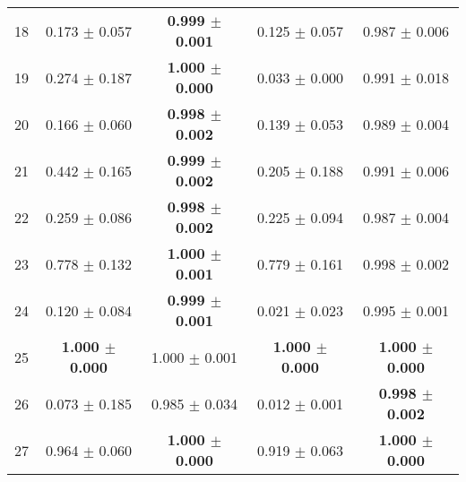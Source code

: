 \begin{table}[!ht]
{\begin{tabular}{r c c c c}
18 & 0.173 $\pm$ 0.057 & \textbf{0.999 $\pm$ 0.001} & 0.125 $\pm$ 0.057 & 0.987 $\pm$ 0.006 \\
19 & 0.274 $\pm$ 0.187 & \textbf{1.000 $\pm$ 0.000} & 0.033 $\pm$ 0.000 & 0.991 $\pm$ 0.018 \\
20 & 0.166 $\pm$ 0.060 & \textbf{0.998 $\pm$ 0.002} & 0.139 $\pm$ 0.053 & 0.989 $\pm$ 0.004 \\
21 & 0.442 $\pm$ 0.165 & \textbf{0.999 $\pm$ 0.002} & 0.205 $\pm$ 0.188 & 0.991 $\pm$ 0.006 \\
22 & 0.259 $\pm$ 0.086 & \textbf{0.998 $\pm$ 0.002} & 0.225 $\pm$ 0.094 & 0.987 $\pm$ 0.004 \\
23 & 0.778 $\pm$ 0.132 & \textbf{1.000 $\pm$ 0.001} & 0.779 $\pm$ 0.161 & 0.998 $\pm$ 0.002 \\
24 & 0.120 $\pm$ 0.084 & \textbf{0.999 $\pm$ 0.001} & 0.021 $\pm$ 0.023 & 0.995 $\pm$ 0.001 \\
25 & \textbf{1.000 $\pm$ 0.000} & 1.000 $\pm$ 0.001 & \textbf{1.000 $\pm$ 0.000} & \textbf{1.000 $\pm$ 0.000} \\
26 & 0.073 $\pm$ 0.185 & 0.985 $\pm$ 0.034 & 0.012 $\pm$ 0.001 & \textbf{0.998 $\pm$ 0.002} \\
27 & 0.964 $\pm$ 0.060 & \textbf{1.000 $\pm$ 0.000} & 0.919 $\pm$ 0.063 & \textbf{1.000 $\pm$ 0.000} \\
\end{tabular}}
\end{table}
